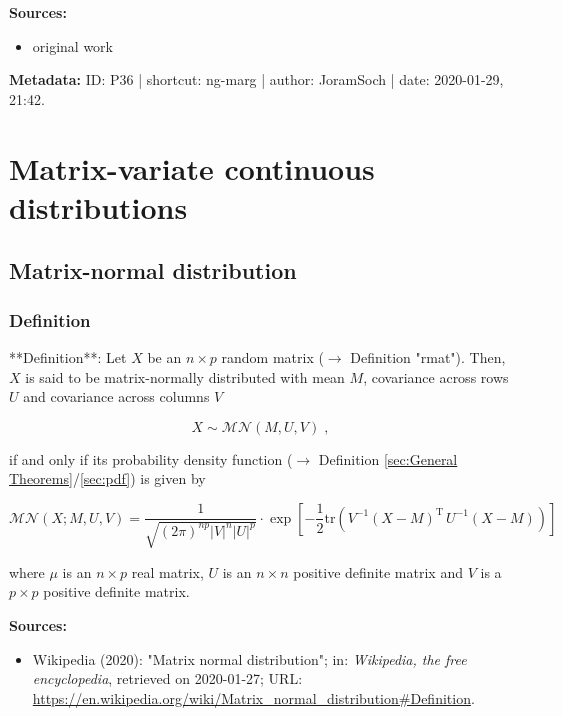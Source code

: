 \documentclass[a4paper,12pt]{book}
\begin{document}
\vspace{1em}
\textbf{Sources:}
\begin{itemize}
\item original work\end{itemize}


\vspace{1em}
\textbf{Metadata:} ID: P36 | shortcut: ng-marg | author: JoramSoch | date: 2020-01-29, 21:42.


\pagebreak
\section{Matrix-variate continuous distributions}

\subsection{Matrix-normal distribution}

\subsubsection[\textit{Definition}]{Definition} \label{sec:matn}

**Definition**: Let $X$ be an $n \times p$ random matrix ($\rightarrow$ Definition "rmat"). Then, $X$ is said to be matrix-normally distributed with mean $M$, covariance across rows $U$ and covariance across columns $V$

\begin{equation} \label{eq:matn-matn}
X \sim \mathcal{MN}(M, U, V) \; ,
\end{equation}

if and only if its probability density function ($\rightarrow$ Definition \ref{sec:General Theorems}/\ref{sec:pdf}) is given by

\begin{equation} \label{eq:matn-matn-pdf}
\mathcal{MN}(X; M, U, V) = \frac{1}{\sqrt{(2\pi)^{np} |V|^n |U|^p}} \cdot \exp\left[-\frac{1}{2} \mathrm{tr}\left( V^{-1} (X-M)^\mathrm{T} \, U^{-1} (X-M) \right) \right]
\end{equation}

where $\mu$ is an $n \times p$ real matrix, $U$ is an $n \times n$ positive definite matrix and $V$ is a $p \times p$ positive definite matrix.

\vspace{1em}
\textbf{Sources:}
\begin{itemize}
\item Wikipedia (2020): "Matrix normal distribution"; in: \textit{Wikipedia, the free encyclopedia}, retrieved on 2020-01-27; URL: \url{https://en.wikipedia.org/wiki/Matrix_normal_distribution#Definition}.
\end{itemize}
\end{document}
